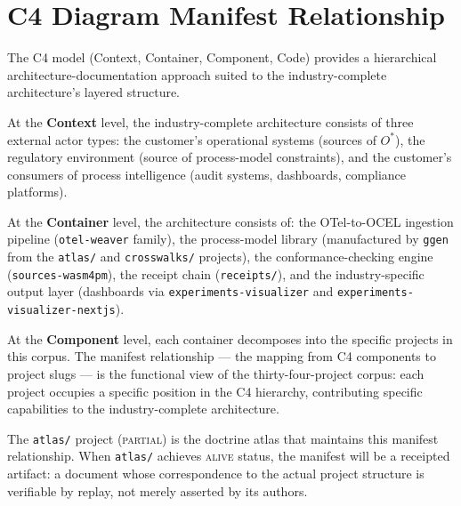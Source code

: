 \section{C4 Diagram Manifest Relationship}

The C4 model (Context, Container, Component, Code) provides a hierarchical architecture-documentation approach suited to the industry-complete architecture's layered structure.

At the \textbf{Context} level, the industry-complete architecture consists of three external actor types: the customer's operational systems (sources of $O^{*}$), the regulatory environment (source of process-model constraints), and the customer's consumers of process intelligence (audit systems, dashboards, compliance platforms).

At the \textbf{Container} level, the architecture consists of: the OTel-to-OCEL ingestion pipeline (\texttt{otel-weaver} family), the process-model library (manufactured by \texttt{ggen} from the \texttt{atlas/} and \texttt{crosswalks/} projects), the conformance-checking engine (\texttt{sources-wasm4pm}), the receipt chain (\texttt{receipts/}), and the industry-specific output layer (dashboards via \texttt{experiments-visualizer} and \texttt{experiments-visualizer-nextjs}).

At the \textbf{Component} level, each container decomposes into the specific projects in this corpus. The manifest relationship --- the mapping from C4 components to project slugs --- is the functional view of the thirty-four-project corpus: each project occupies a specific position in the C4 hierarchy, contributing specific capabilities to the industry-complete architecture.

The \texttt{atlas/} project (\textsc{partial}) is the doctrine atlas that maintains this manifest relationship. When \texttt{atlas/} achieves \textsc{alive} status, the manifest will be a receipted artifact: a document whose correspondence to the actual project structure is verifiable by replay, not merely asserted by its authors.

